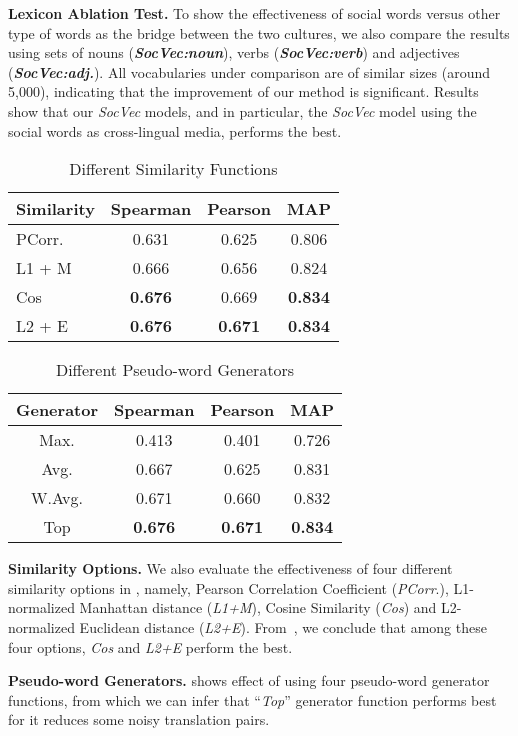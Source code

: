 \textbf{Lexicon Ablation Test.} To show the effectiveness of social words versus other type
of words as the bridge between the two cultures, we also compare the
results using sets of nouns (\textbf{\textit{SocVec:noun}}), verbs (\textbf{\textit{SocVec:verb}}) and adjectives (\textbf{\textit{SocVec:adj.}}).
All vocabularies under comparison are of similar sizes 
(around 5,000), indicating that the improvement of our method 
is significant.
Results show that our \textit{SocVec} models, and in particular, the \textit{SocVec} model using the social words as cross-lingual media, performs the best. 
\begin{table}[t]
	\centering
	\small
	\caption{{Different Similarity Functions}}
	\label{tab:mcdne_res_2}
	\begin{tabular}{l|c|c|c}
		\textbf{Similarity} & \textbf{Spearman} & \textbf{Pearson}   & \textbf{MAP} \\ \hline
		PCorr. & 0.631 & 0.625 & 0.806\\ 
		L1 + M & 0.666 & 0.656 & 0.824 \\  
		Cos & \textbf{0.676} & 0.669 & \textbf{0.834} \\ 
		L2 + E & \textbf{0.676} & \textbf{0.671} & \textbf{0.834} \\ \hline
	\end{tabular}
\end{table}

\begin{table}[t]
	\centering
	\small
	\caption{{Different Pseudo-word Generators}}
	\begin{tabular}{c|c|c|c}
		\textbf{Generator} & \textbf{Spearman} & \textbf{Pearson}   & \textbf{MAP} \\  \hline
		Max. & 0.413 & 0.401 & 0.726\\ 
		Avg. & 0.667 & 0.625 & 0.831\\ 
		W.Avg. & 0.671 & 0.660 & 0.832 \\  
		Top & \textbf{0.676} & \textbf{0.671} & \textbf{0.834} \\ \hline
	\end{tabular}
	\label{tab:mcdne_res_3}
\end{table}
\textbf{Similarity Options.} We also evaluate the effectiveness of four different similarity options in 
\textit{\socvec}, namely, Pearson Correlation Coefficient 
(\textit{PCorr}.), L1-normalized Manhattan distance (\textit{L1+M}), 
Cosine Similarity (\textit{Cos}) and  L2-normalized Euclidean distance (\textit{L2+E}).
From~, we conclude that among these four options, \textit{Cos} and \textit{L2+E} perform the best. 

\textbf{Pseudo-word Generators.} 
 shows effect of using four pseudo-word generator functions, from which we can infer that ``\textit{Top}'' generator function performs best for 
it reduces some noisy translation pairs. 
